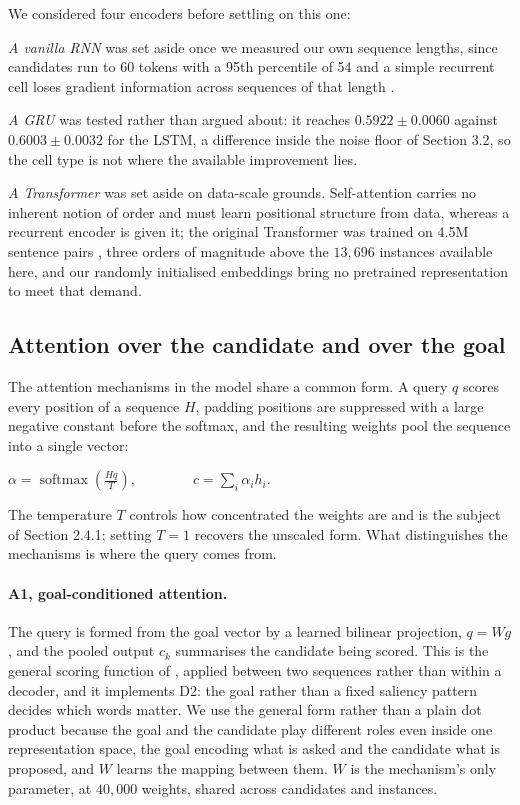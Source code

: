 \documentclass[11pt]{article}
\begin{document}
We considered four encoders before settling on this one:

\textit{A vanilla RNN} was set aside once we measured our own sequence lengths, since candidates run to 60 tokens with a 95th percentile of 54 and a simple recurrent cell loses gradient information across sequences of that length \citep{hochreiter1997long}.

\textit{A GRU} was tested rather than argued about: it reaches $0.5922\pm 0.0060$ against $0.6003\pm 0.0032$ for the LSTM, a difference inside the noise floor of Section 3.2, so the cell type is not where the available improvement lies.

\textit{A Transformer} was set aside on data-scale grounds. Self-attention carries no inherent notion of order and must learn positional structure from data, whereas a recurrent encoder is given it; the original Transformer was trained on 4.5M sentence pairs \citep{vaswani2017attention}, three orders of magnitude above the $13,696$ instances available here, and our randomly initialised embeddings bring no pretrained representation to meet that demand.

\subsection{Attention over the candidate and over the goal}

The attention mechanisms in the model share a common form. A query $q$ scores every position of a sequence $H$, padding positions are suppressed with a large negative constant before the softmax, and the resulting weights pool the sequence into a single vector:

$\alpha =\operatorname{softmax}\left( \frac{Hq}{T} \right),\qquad \qquad c=\sum_{i} {\alpha }_{i}{h}_{i}.$

The temperature $T$ controls how concentrated the weights are and is the subject of Section 2.4.1; setting $T=1$ recovers the unscaled form. What distinguishes the mechanisms is where the query comes from.

\paragraph{A1, goal-conditioned attention.}

The query is formed from the goal vector by a learned bilinear projection, $q=Wg$, and the pooled output ${c}_{k}$ summarises the candidate being scored. This is the general scoring function of \citet{luong2015effective}, applied between two sequences rather than within a decoder, and it implements D2: the goal rather than a fixed saliency pattern decides which words matter. We use the general form rather than a plain dot product because the goal and the candidate play different roles even inside one representation space, the goal encoding what is asked and the candidate what is proposed, and $W$ learns the mapping between them. $W$ is the mechanism's only parameter, at $40,000$ weights, shared across candidates and instances.
\end{document}
